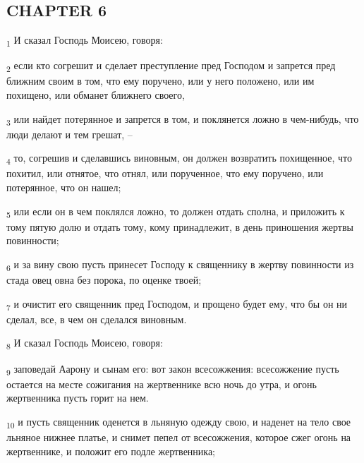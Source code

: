 \subsection{CHAPTER 6}
\begin{tcolorbox}
\textsubscript{1} И сказал Господь Моисею, говоря:
\end{tcolorbox}
\begin{tcolorbox}
\textsubscript{2} если кто согрешит и сделает преступление пред Господом и запрется пред ближним своим в том, что ему поручено, или у него положено, или им похищено, или обманет ближнего своего,
\end{tcolorbox}
\begin{tcolorbox}
\textsubscript{3} или найдет потерянное и запрется в том, и поклянется ложно в чем-нибудь, что люди делают и тем грешат, --
\end{tcolorbox}
\begin{tcolorbox}
\textsubscript{4} то, согрешив и сделавшись виновным, он должен возвратить похищенное, что похитил, или отнятое, что отнял, или порученное, что ему поручено, или потерянное, что он нашел;
\end{tcolorbox}
\begin{tcolorbox}
\textsubscript{5} или если он в чем поклялся ложно, то должен отдать сполна, и приложить к тому пятую долю и отдать тому, кому принадлежит, в день приношения жертвы повинности;
\end{tcolorbox}
\begin{tcolorbox}
\textsubscript{6} и за вину свою пусть принесет Господу к священнику в жертву повинности из стада овец овна без порока, по оценке твоей;
\end{tcolorbox}
\begin{tcolorbox}
\textsubscript{7} и очистит его священник пред Господом, и прощено будет ему, что бы он ни сделал, все, в чем он сделался виновным.
\end{tcolorbox}
\begin{tcolorbox}
\textsubscript{8} И сказал Господь Моисею, говоря:
\end{tcolorbox}
\begin{tcolorbox}
\textsubscript{9} заповедай Аарону и сынам его: вот закон всесожжения: всесожжение пусть остается на месте сожигания на жертвеннике всю ночь до утра, и огонь жертвенника пусть горит на нем.
\end{tcolorbox}
\begin{tcolorbox}
\textsubscript{10} и пусть священник оденется в льняную одежду свою, и наденет на тело свое льняное нижнее платье, и снимет пепел от всесожжения, которое сжег огонь на жертвеннике, и положит его подле жертвенника;
\end{tcolorbox}
